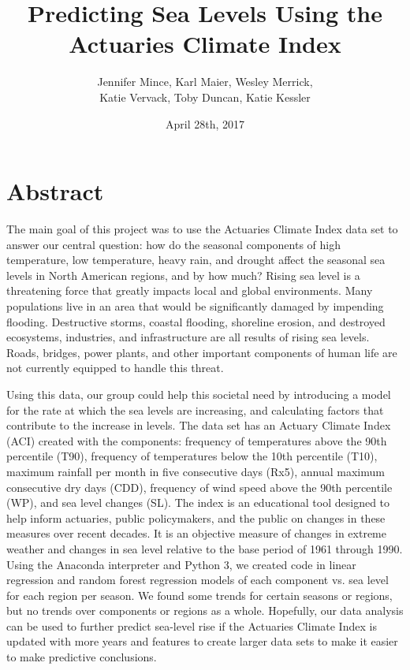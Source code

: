 \documentclass[12pt]{report}
\title{Predicting Sea Levels Using the Actuaries Climate Index}
\date{April 28th, 2017}
\author{Jennifer Mince, Karl Maier, Wesley Merrick,\\ Katie Vervack, Toby Duncan, Katie Kessler}
\begin{document}
	\maketitle
\section*{Abstract} 
\indent	\par The main goal of this project was to use the Actuaries Climate Index data set to answer our central question: how do the seasonal components of high temperature, low temperature, heavy rain, and drought affect the seasonal sea levels in North American regions, and by how much? Rising sea level is a threatening force that greatly impacts local and global environments. Many populations live in an area that would be significantly damaged by impending flooding. Destructive storms, coastal flooding, shoreline erosion, and destroyed ecosystems, industries, and infrastructure are all results of rising sea levels. Roads, bridges, power plants, and other important components of human life are not currently equipped to handle this threat. 
		\par Using this data, our group could help this societal need by introducing a model for the rate at which the sea levels are increasing, and calculating factors that contribute to the increase in levels. The data set has an Actuary Climate Index (ACI) created with the components: frequency of temperatures above the 90th percentile (T90), frequency of temperatures below the 10th percentile (T10), maximum rainfall per month in five consecutive days (Rx5), annual maximum consecutive dry days (CDD), frequency of wind speed above the 90th percentile (WP), and sea level changes (SL). The index is an educational tool designed to help inform actuaries, public policymakers, and the public on changes in these measures over recent decades.  It is an objective measure of changes in extreme weather and changes in sea level relative to the base period of 1961 through 1990. Using the Anaconda interpreter and Python 3, we created code in linear regression and random forest regression models of each component vs. sea level for each region per season. We found some trends for certain seasons or regions, but no trends over components or regions as a whole. Hopefully, our data analysis can be used to further predict sea-level rise if the Actuaries Climate Index is updated with more years and features to create larger data sets to make it easier to make predictive conclusions. 
\end{document}
